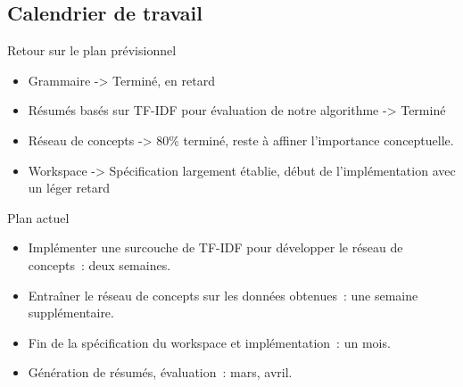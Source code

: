 \documentclass{beamer}
\begin{document}
\subsection{Calendrier de travail}
\begin{frame}
	\begin{block}{Retour sur le plan prévisionnel}
		\begin{itemize}
			\item Grammaire -> Terminé, en retard
			\item Résumés basés sur TF-IDF pour évaluation de notre algorithme -> Terminé
			\item Réseau de concepts -> 80\% terminé, reste à affiner l'importance conceptuelle.
			\item Workspace -> Spécification largement établie, début de l'implémentation avec un léger retard
		\end{itemize}
	\end{block}
\end{frame}

\begin{frame}
	\begin{block}{Plan actuel}
		\begin{itemize}
			\item Implémenter une surcouche de TF-IDF pour développer le réseau de concepts~: deux semaines.
			\item Entraîner le réseau de concepts sur les données obtenues~: une semaine supplémentaire.
			\item Fin de la spécification du workspace et implémentation~: un mois.
			\item Génération de résumés, évaluation~: mars, avril.
		\end{itemize}
	\end{block}
\end{frame}
\end{document}
